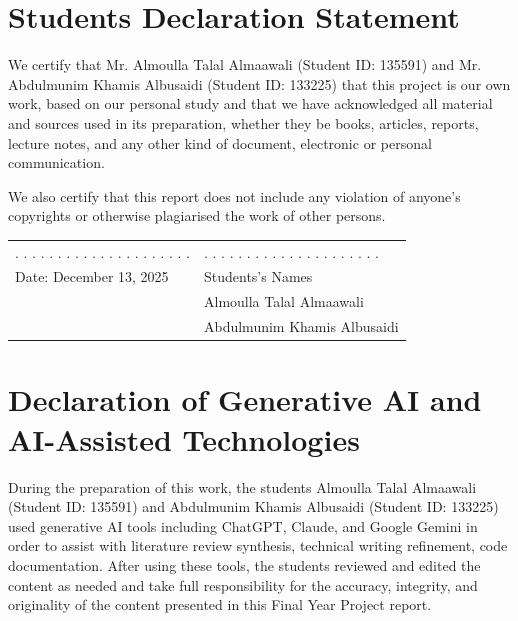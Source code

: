 \documentclass[11pt,a4paper]{article}
\begin{document}
\newpage
\thispagestyle{empty}
\section*{Students Declaration Statement}

We certify that Mr. Almoulla Talal Almaawali (Student ID: 135591) and Mr. Abdulmunim Khamis Albusaidi (Student ID: 133225) that this project is our own work, based on our personal study and that we have acknowledged all material and sources used in its preparation, whether they be books, articles, reports, lecture notes, and any other kind of document, electronic or personal communication.

We also certify that this report does not include any violation of anyone's copyrights or otherwise plagiarised the work of other persons.

\vspace{2cm}

\noindent
\begin{tabular}{@{}p{}p{}@{}}
. . . . . . . . . . . . . . . . . . . . . & . . . . . . . . . . . . . . . . . . . . . \\
Date: December 13, 2025 & Students's Names \\
& Almoulla Talal Almaawali \\
& Abdulmunim Khamis Albusaidi
\end{tabular}

\newpage
\thispagestyle{empty}
\section*{Declaration of Generative AI and AI-Assisted Technologies}

During the preparation of this work, the students Almoulla Talal Almaawali (Student ID: 135591) and Abdulmunim Khamis Albusaidi (Student ID: 133225) used generative AI tools including ChatGPT, Claude, and Google Gemini in order to assist with literature review synthesis, technical writing refinement, code documentation. After using these tools, the students reviewed and edited the content as needed and take full responsibility for the accuracy, integrity, and originality of the content presented in this Final Year Project report.
\end{document}
